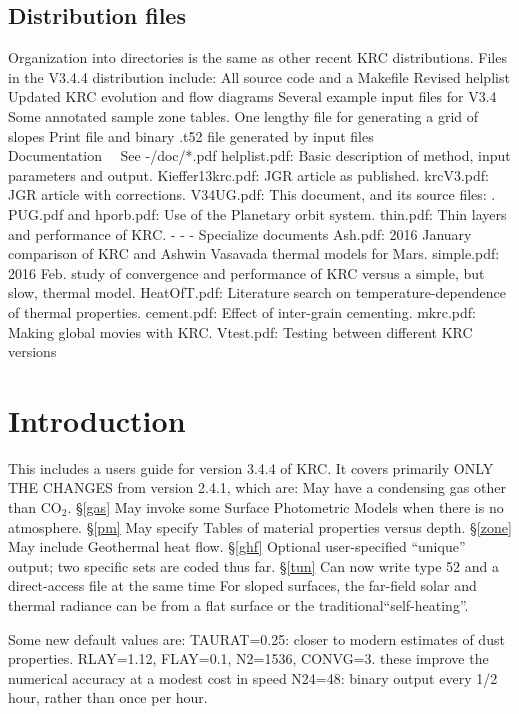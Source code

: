 \documentclass{article}
\begin{document}
\subsection{Distribution files}
 Organization into directories is the same as other recent KRC distributions. 
Files in the V3.4.4 distribution include: 
\qi All source code and a Makefile
\qi Revised helplist
\qi Updated KRC evolution and flow diagrams
\qi Several example input files for V3.4
\qii Some annotated sample zone tables.
\qii One lengthy file for generating a grid of slopes 
\qi Print file and binary .t52 file generated by input files
\\ Documentation  \ \ See -/doc/*.pdf
\qi helplist.pdf:   Basic description of method, input parameters and output.
\qi Kieffer13krc.pdf: JGR article as published.
\qi krcV3.pdf:  JGR article with corrections.    
\qi V34UG.pdf: This document, and its source files: .
\qi PUG.pdf and hporb.pdf: Use of the Planetary orbit system.
\qi thin.pdf: Thin layers and performance of KRC.
\qi - - -  Specialize documents
\qi Ash.pdf:  2016 January comparison of KRC and Ashwin Vasavada thermal models for Mars.
\qi simple.pdf:  2016 Feb. study of convergence and performance of KRC versus a simple, but slow, thermal model.
\qi HeatOfT.pdf: Literature search on temperature-dependence of thermal properties.
\qi cement.pdf: Effect of inter-grain cementing.
\qi mkrc.pdf:  Making global movies with KRC.
\qi Vtest.pdf: Testing between different KRC versions


\section{Introduction \label{UG}}

This includes a users guide for version 3.4.4 of KRC. It covers primarily ONLY THE CHANGES from version 2.4.1, which are:
\qi May have a condensing gas other than CO$_2$. \S \ref{gas} 
 \qi May invoke some Surface Photometric Models when there is no atmosphere. \S \ref{pm}
 \qi May specify Tables of material properties versus depth. \S \ref{zone}
 \qi May include Geothermal heat flow. \S \ref{ghf} 
\qi Optional user-specified ``unique'' output; two specific sets are coded thus far. \S \ref{tun}
\qi Can now write type 52 and a direct-access file at the same time
\qi For sloped surfaces, the far-field solar and thermal radiance can be from a flat surface or the traditional``self-heating''.

Some new default values are: 
\qi TAURAT=0.25: closer to modern estimates of dust properties.
\qi RLAY=1.12, FLAY=0.1, N2=1536, CONVG=3.
\qii these improve the numerical accuracy at a modest cost in speed
\qi N24=48: binary output every 1/2 hour, rather than once per hour.
\end{document}

